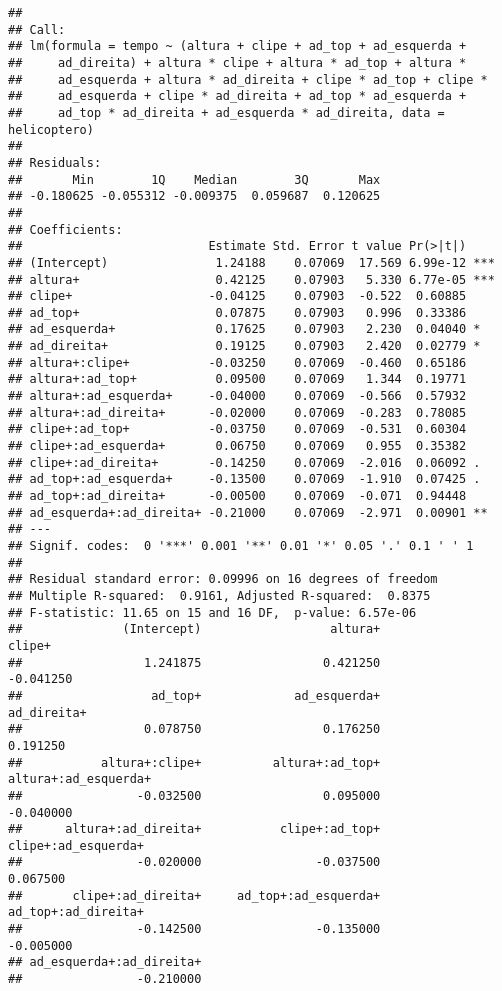 \documentclass{article}\usepackage[]{graphicx}\usepackage[]{color}
\makeatletter
\newenvironment{kframe}{%
 \def\at@end@of@kframe{}%
 \ifinner\ifhmode%
  \def\at@end@of@kframe{\end{minipage}}%
  \begin{minipage}{\columnwidth}%
 \fi\fi%
 \def\FrameCommand##1{\hskip\@totalleftmargin \hskip-\fboxsep
 \colorbox{shadecolor}{##1}\hskip-\fboxsep
     \hskip-\linewidth \hskip-\@totalleftmargin \hskip\columnwidth}%
 \MakeFramed {\advance\hsize-\width
   \@totalleftmargin\z@ \linewidth\hsize
   \@setminipage}}%
 {\par\unskip\endMakeFramed%
 \at@end@of@kframe}
\newenvironment{knitrout}{}{} %
\makeatother
\begin{document}
\begin{knitrout}
\color{fgcolor}\begin{kframe}
\begin{verbatim}
## 
## Call:
## lm(formula = tempo ~ (altura + clipe + ad_top + ad_esquerda + 
##     ad_direita) + altura * clipe + altura * ad_top + altura * 
##     ad_esquerda + altura * ad_direita + clipe * ad_top + clipe * 
##     ad_esquerda + clipe * ad_direita + ad_top * ad_esquerda + 
##     ad_top * ad_direita + ad_esquerda * ad_direita, data = helicoptero)
## 
## Residuals:
##       Min        1Q    Median        3Q       Max 
## -0.180625 -0.055312 -0.009375  0.059687  0.120625 
## 
## Coefficients:
##                          Estimate Std. Error t value Pr(>|t|)    
## (Intercept)               1.24188    0.07069  17.569 6.99e-12 ***
## altura+                   0.42125    0.07903   5.330 6.77e-05 ***
## clipe+                   -0.04125    0.07903  -0.522  0.60885    
## ad_top+                   0.07875    0.07903   0.996  0.33386    
## ad_esquerda+              0.17625    0.07903   2.230  0.04040 *  
## ad_direita+               0.19125    0.07903   2.420  0.02779 *  
## altura+:clipe+           -0.03250    0.07069  -0.460  0.65186    
## altura+:ad_top+           0.09500    0.07069   1.344  0.19771    
## altura+:ad_esquerda+     -0.04000    0.07069  -0.566  0.57932    
## altura+:ad_direita+      -0.02000    0.07069  -0.283  0.78085    
## clipe+:ad_top+           -0.03750    0.07069  -0.531  0.60304    
## clipe+:ad_esquerda+       0.06750    0.07069   0.955  0.35382    
## clipe+:ad_direita+       -0.14250    0.07069  -2.016  0.06092 .  
## ad_top+:ad_esquerda+     -0.13500    0.07069  -1.910  0.07425 .  
## ad_top+:ad_direita+      -0.00500    0.07069  -0.071  0.94448    
## ad_esquerda+:ad_direita+ -0.21000    0.07069  -2.971  0.00901 ** 
## ---
## Signif. codes:  0 '***' 0.001 '**' 0.01 '*' 0.05 '.' 0.1 ' ' 1
## 
## Residual standard error: 0.09996 on 16 degrees of freedom
## Multiple R-squared:  0.9161,	Adjusted R-squared:  0.8375 
## F-statistic: 11.65 on 15 and 16 DF,  p-value: 6.57e-06
##              (Intercept)                  altura+                   clipe+ 
##                 1.241875                 0.421250                -0.041250 
##                  ad_top+             ad_esquerda+              ad_direita+ 
##                 0.078750                 0.176250                 0.191250 
##           altura+:clipe+          altura+:ad_top+     altura+:ad_esquerda+ 
##                -0.032500                 0.095000                -0.040000 
##      altura+:ad_direita+           clipe+:ad_top+      clipe+:ad_esquerda+ 
##                -0.020000                -0.037500                 0.067500 
##       clipe+:ad_direita+     ad_top+:ad_esquerda+      ad_top+:ad_direita+ 
##                -0.142500                -0.135000                -0.005000 
## ad_esquerda+:ad_direita+ 
##                -0.210000
\end{verbatim}
\end{kframe}
\end{knitrout}
\end{document}
